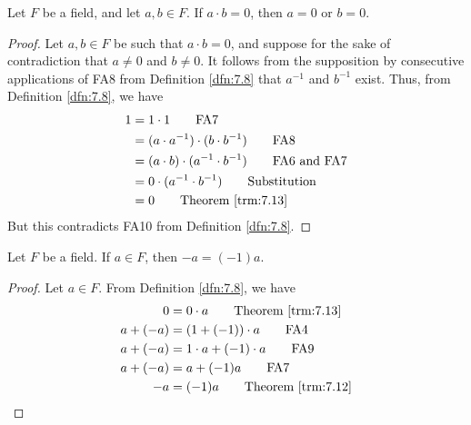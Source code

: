 \documentclass[../main.tex]{subfiles}
\begin{document}
\begin{theorem}\label{trm:7.17}
    Let $F$ be a field, and let $a,b\in F$. If $a\cdot b=0$, then $a=0$ or $b=0$.
    \begin{proof}
        Let $a,b\in F$ be such that $a\cdot b=0$, and suppose for the sake of contradiction that $a\neq 0$ and $b\neq 0$. It follows from the supposition by consecutive applications of FA8 from Definition \ref{dfn:7.8} that $a^{-1}$ and $b^{-1}$ exist. Thus, from Definition \ref{dfn:7.8}, we have
        \begin{align*}
            1 &= 1\cdot 1\tag*{FA7}\\
            &= (a\cdot a^{-1})\cdot(b\cdot b^{-1})\tag*{FA8}\\
            &= (a\cdot b)\cdot(a^{-1}\cdot b^{-1})\tag*{FA6 and FA7}\\
            &= 0\cdot(a^{-1}\cdot b^{-1})\tag*{Substitution}\\
            &= 0\tag*{Theorem \ref{trm:7.13}}
        \end{align*}
        But this contradicts FA10 from Definition \ref{dfn:7.8}.
    \end{proof}
\end{theorem}

\begin{lemma}\label{lem:7.18}
    Let $F$ be a field. If $a\in F$, then $-a=(-1)a$.
    \begin{proof}
        Let $a\in F$. From Definition \ref{dfn:7.8}, we have
        \begin{align*}
            0 &= 0\cdot a\tag*{Theorem \ref{trm:7.13}}\\
            a+(-a) &= (1+(-1))\cdot a\tag*{FA4}\\
            a+(-a) &= 1\cdot a+(-1)\cdot a\tag*{FA9}\\
            a+(-a) &= a+(-1)a\tag*{FA7}\\
            -a &= (-1)a\tag*{Theorem \ref{trm:7.12}}
        \end{align*}
    \end{proof}
\end{lemma}
\end{document}
